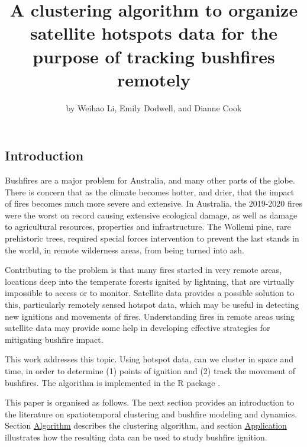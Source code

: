 \title{A clustering algorithm to organize satellite hotspots data for
the purpose of tracking bushfires remotely}
\author{by Weihao Li, Emily Dodwell, and Dianne Cook}

\maketitle


\hypertarget{introduction}{%
\subsection{Introduction}\label{introduction}}

Bushfires are a major problem for Australia, and many other parts of the
globe. There is concern that as the climate becomes hotter, and drier,
that the impact of fires becomes much more severe and extensive. In
Australia, the 2019-2020 fires were the worst on record causing
extensive ecological damage, as well as damage to agricultural
resources, properties and infrastructure. The Wollemi pine, rare
prehistoric trees, required special forces intervention to prevent the
last stands in the world, in remote wilderness areas, from being turned
into ash.

Contributing to the problem is that many fires started in very remote
areas, locations deep into the temperate forests ignited by lightning,
that are virtually impossible to access or to monitor. Satellite data
provides a possible solution to this, particularly remotely sensed
hotspot data, which may be useful in detecting new ignitions and
movements of fires. Understanding fires in remote areas using satellite
data may provide some help in developing effective strategies for
mitigating bushfire impact.

This work addresses this topic. Using hotspot data, can we cluster in
space and time, in order to determine (1) points of ignition and (2)
track the movement of bushfires. The algorithm is implemented in the R
package .

This paper is organised as follows. The next section provides an
introduction to the literature on spatiotemporal clustering and bushfire
modeling and dynamics. Section \protect\hyperlink{algorithm}{Algorithm}
describes the clustering algorithm, and section
\protect\hyperlink{application}{Application} illustrates how the
resulting data can be used to study bushfire ignition.

